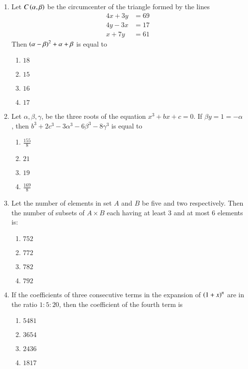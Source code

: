 \documentclass[journal]{IEEEtran}
\begin{document}
\begin{enumerate}
{}
\item{
Let $C\left(\alpha,\beta\right)$ be the circumcenter of the triangle formed by the lines\\
\begin{align*}
4x+3y&=69\\
4y-3x&=17\\
x+7y&=61
\end{align*}
Then $\left(\alpha-\beta\right)^2+\alpha+\beta$ is equal to
\begin{multicols}{4}
\begin{enumerate}
\item $18$
\item $15$
\item $16$
\item $17$
\end{enumerate}
\end{multicols}
}
\item{
Let $\alpha,\beta,\gamma$, be the three roots of the equation $x^3+bx+c=0$. If $\beta y=1=-\alpha$, then $b^3+2c^3-3\alpha^3-6\beta^3-8\gamma^3$ is equal to
\begin{multicols}{4}
\begin{enumerate}
\item $\frac{155}{8}$
\item $21$
\item $19$
\item $\frac{169}{8}$
\end{enumerate}
\end{multicols}
}
\item{
Let the number of elements in set $A$ and $B$ be five and two respectively. Then the number of subsets of $A\times B$ each having at least $3$ and at most $6$ elements is:
\begin{multicols}{4}
\begin{enumerate}
\item $752$
\item $772$
\item $782$
\item $792$
\end{enumerate}
\end{multicols}
}
\item{
If the coefficients of three consecutive terms in the expansion of $\left(1+x\right)^n$ are in the ratio $1:5:20$, then the coefficient of the fourth term is 
\begin{multicols}{4}
\begin{enumerate}
\item $5481$
\item $3654$
\item $2436$
\item $1817$
\end{enumerate}
\end{multicols}

}
\end{enumerate}
\end{document}
